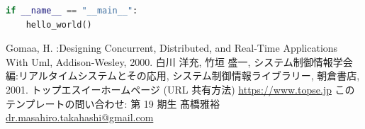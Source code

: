 \documentclass[a4paper,9pt]{extarticle}
\begin{document}
\begin{multicols}{2}
\begin{minipage}{0.95\linewidth}
\begin{lstlisting}[language=Python,caption={コードのキャプションはこちら.},label={code:helloworld}]
if __name__ == "__main__":
    hello_world()
\end{lstlisting}
\end{minipage}


\begin{thebibliography}{99}
 Gomaa,  H. :Designing Concurrent,  Distributed,  and Real-Time Applications With Uml, Addison-Wesley, 2000.
 白川 洋充,  竹垣 盛一,  システム制御情報学会編:リアルタイムシステムとその応用,   システム制御情報ライブラリー, 朝倉書店,  2001.
 トップエスイーホームページ (URL 共有方法) \url{https://www.topse.jp}
 このテンプレートの問い合わせ: 第 19 期生 髙橋雅裕 \href{mailto:dr.masahiro.takahashi@gmail.com}{dr.masahiro.takahashi@gmail.com}
\end{thebibliography}

\end{multicols}
\end{document}
